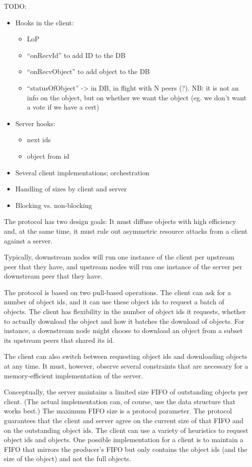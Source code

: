 TODO:
\begin{itemize}
\item Hooks in the client:
  \begin{itemize}
  \item LoP
  \item “onRecvId” to add ID to the DB
  \item “onRecvObject” to add object to the DB
  \item “statusOfObject” -> in DB, in flight with N peers (?). NB: it is not an
    info on the object, but on whether we want the object (eg. we don't want a
    vote if we have a cert)
  \end{itemize}
\item Server hooks:
  \begin{itemize}
  \item next ids
  \item object from id
  \end{itemize}
\item Several client implementations; orchestration
\item Handling of sizes by client and server
\item Blocking vs. non-blocking
\end{itemize}

The protocol has two design goals: It must diffuse objects with high efficiency
and, at the same time, it must rule out asymmetric resource attacks from a
client against a server.

Typically, downstream nodes will run one instance of the client per upstream
peer that they have, and upstream nodes will run one instance of the server per
downstream peer that they have.

The protocol is based on two pull-based operations. The client can ask for a
number of object ids, and it can use these object ids to request a batch of
objects. The client has flexibility in the number of object ids it requests,
whether to actually download the object and how it batches the download of
objects. For instance, a downstream node might choose to download an object from
a subset its upstream peers that shared its id.

The client can also switch between requesting object ids and downloading objects
at any time. It must, however, observe several constraints that are necessary
for a memory-efficient implementation of the server.

Conceptually, the server maintains a limited size FIFO of outstanding objects
per client. (The actual implementation can, of course, use the data structure
that works best.) The maximum FIFO size is a protocol parameter. The protocol
guarantees that the client and server agree on the current size of that FIFO and
on the outstanding object ids. The client can use a variety of heuristics to
request object ids and objects. One possible implementation for a client is to
maintain a FIFO that mirrors the producer's FIFO but only contains the object
ids (and the size of the object) and not the full objects.

